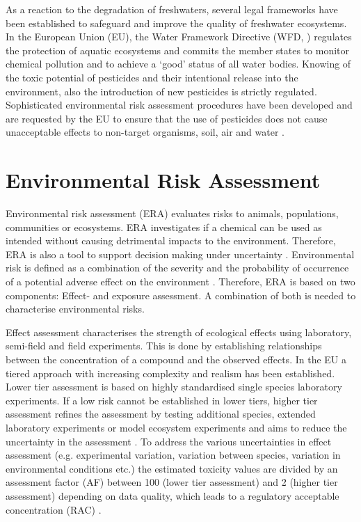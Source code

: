 As a reaction to the degradation of freshwaters, several legal frameworks have been established to safeguard and improve the quality of freshwater ecosystems. 
In the European Union (EU), the Water Framework Directive (WFD, \citet{european_union_directive_2000}) regulates the protection of aquatic ecosystems and commits the member states to monitor chemical pollution and to achieve a `good' status of all water bodies. 
Knowing of the toxic potential of pesticides and their intentional release into the environment, also the introduction of new pesticides is strictly regulated.
Sophisticated environmental risk assessment procedures have been developed and are requested by the EU to ensure that the use of pesticides does not cause unacceptable effects to non-target organisms, soil, air and water \citep{european_union_regulation_2009}. 



\section{Environmental Risk Assessment}

Environmental risk assessment (ERA) evaluates risks to animals, populations, communities or ecosystems.
ERA investigates if a chemical can be used as intended without causing detrimental impacts to the environment.
Therefore, ERA is also a tool to support decision making under uncertainty \citep{newman_fundamentals_2015}. 
Environmental risk is defined as a combination of the severity and the probability of occurrence of a potential adverse effect on the environment \citep{suter_ecological_2007}. 
Therefore, ERA is based on two components: Effect- and exposure assessment.
A combination of both is needed to characterise environmental risks.

Effect assessment characterises the strength of ecological effects using laboratory, semi-field and field experiments.
This is done by establishing relationships between the concentration of a compound and the observed effects.
In the EU a tiered approach with increasing complexity and realism has been established.
Lower tier assessment is based on highly standardised single species laboratory experiments.
If a low risk cannot be established in lower tiers, higher tier assessment refines the assessment by testing additional species, extended laboratory experiments or model ecosystem experiments and aims to reduce the uncertainty in the assessment \citep{efsa_guidance_2013, brock_aquatic_2006}. 
To address the various uncertainties in effect assessment (e.g. experimental variation, variation between species, variation in environmental conditions etc.) the estimated toxicity values are divided by an assessment factor (AF) between 100 (lower tier assessment) and 2 (higher tier assessment) depending on data quality, which leads to a regulatory acceptable concentration (RAC) \citep{efsa_guidance_2013, brock_aquatic_2006}. 

